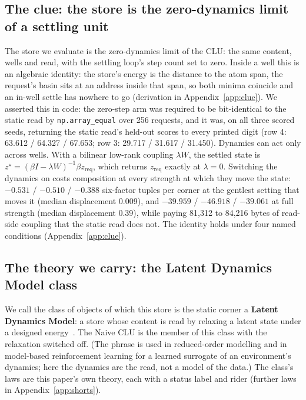 \documentclass{article} %
\begin{document}
\subsection{The clue: the store is the zero-dynamics limit of a settling unit}
\label{sec:clue}

The store we evaluate is the zero-dynamics limit of the CLU: the same content, wells and read,
with the settling loop's step count set to zero. Inside a well this is an algebraic identity: the store's energy is the distance to the atom span, the request's basin sits at an address inside that span, so both minima coincide and an in-well settle has nowhere
to go (derivation in Appendix~\ref{app:clue}). We asserted this in code: the zero-step arm was required to be bit-identical to
the static read by \texttt{np.array\_equal} over 256 requests, and it was, on all three scored
seeds, returning the static read's held-out scores to every printed digit (row 4: 63.612 /
64.327 / 67.653; row 3: 29.717 / 31.617 / 31.450). %
Dynamics can act only across wells. With a bilinear low-rank coupling $\lambda W$, the settled
state is $z^\star=(\beta I-\lambda W)^{-1}\beta z_{\text{req}}$, which returns
$z_{\text{req}}$ exactly at $\lambda=0$. Switching the dynamics on costs composition at every
strength at which they move the state: $-0.531$ / $-0.510$ / $-0.388$ six-factor tuples per
corner at the gentlest setting that moves it (median displacement 0.009), and $-39.959$ /
$-46.918$ / $-39.061$ at full strength (median displacement 0.39), while paying 81,312 to 84,216 bytes of read-side coupling that the static read does not. %
The identity holds under four named conditions (Appendix~\ref{app:clue}).

\subsection{The theory we carry: the Latent Dynamics Model class}
\label{sec:theory}

We call the class of objects of which this store is the static corner a \textbf{Latent Dynamics
Model}: a store whose content is read by relaxing a latent state under a designed energy~\citep{hopfield1982neural,krotov2016dense,ramsauer2021hopfield,hoover2023energy,kong2024reservoir}. The
Naive CLU is the member of this class with the relaxation switched off. (The phrase is used in
reduced-order modelling and in model-based reinforcement learning for a learned surrogate of an
environment's dynamics; here the dynamics are the read, not a model of the data.) The class's laws are this paper's own theory, each with a status label and rider (further laws in
Appendix~\ref{app:shorts}).
\end{document}
